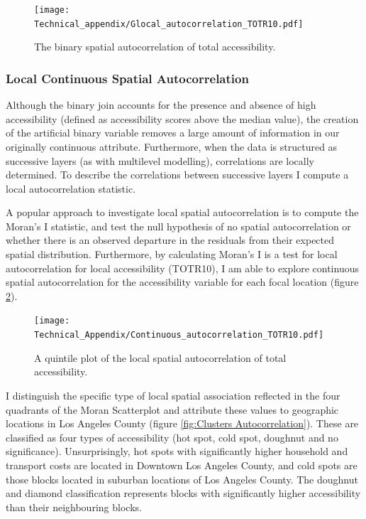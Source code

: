 \documentclass[a4paper,UKenglish]{lipics-v2018}
\begin{document}
\begin{figure}[H]
    \centering
    \texttt{[image: Technical\_appendix/Glocal\_autocorrelation\_TOTR10.pdf]}
    \caption[Global Binary Autocorrelation]{The binary spatial autocorrelation of total accessibility.} 
    \label{fig:Global Binary Autocorrelation}
\end{figure}

\subsubsection{Local Continuous Spatial Autocorrelation}
Although the binary join accounts for the presence and absence of high accessibility (defined as accessibility scores above the median value), the creation of the artificial binary variable removes a large amount of information in our originally continuous attribute. Furthermore, when the data is structured as successive layers (as with multilevel modelling), correlations are locally determined. To describe the correlations between successive layers I compute a local autocorrelation statistic.

A popular approach to investigate local spatial autocorrelation is to compute the Moran’s I statistic, and test the null hypothesis of no spatial autocorrelation or whether there is an observed departure in the residuals from their expected spatial distribution. Furthermore, by calculating Moran's I is a test for local autocorrelation for local accessibility (TOTR10), I am able to explore continuous spatial autocorrelation for the accessibility variable for each focal location (figure \ref{fig:Local Continuous Autocorrelation}). 

\begin{figure}[H]
    \centering
    \texttt{[image: Technical\_Appendix/Continuous\_autocorrelation\_TOTR10.pdf]}
    \caption[Local Continuous Autocorrelation]{A quintile plot of the local spatial autocorrelation of total accessibility.} 
    \label{fig:Local Continuous Autocorrelation}
\end{figure}

I distinguish the specific type of local spatial association reflected in the four quadrants of the Moran Scatterplot and attribute these values to geographic locations in Los Angeles County (figure \ref{fig:Clusters Autocorrelation}). These are classified as four types of accessibility (hot spot, cold spot, doughnut and no significance). Unsurprisingly, hot spots with significantly higher household and transport costs are located in Downtown Los Angeles County, and cold spots are those blocks located in suburban locations of Los Angeles County. The doughnut and diamond classification represents blocks with significantly higher accessibility than their neighbouring blocks.
\end{document}
